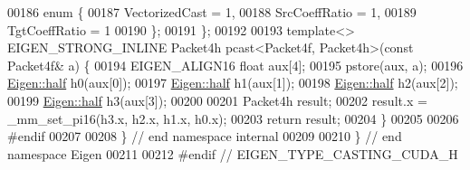 \begin{DoxyCode}
00186   \textcolor{keyword}{enum} \{
00187     VectorizedCast = 1,
00188     SrcCoeffRatio = 1,
00189     TgtCoeffRatio = 1
00190   \};
00191 \};
00192 
00193 \textcolor{keyword}{template}<> EIGEN\_STRONG\_INLINE Packet4h pcast<Packet4f, Packet4h>(\textcolor{keyword}{const} Packet4f& a) \{
00194   EIGEN\_ALIGN16 \textcolor{keywordtype}{float} aux[4];
00195   pstore(aux, a);
00196   \hyperlink{struct_eigen_1_1half}{Eigen::half} h0(aux[0]);
00197   \hyperlink{struct_eigen_1_1half}{Eigen::half} h1(aux[1]);
00198   \hyperlink{struct_eigen_1_1half}{Eigen::half} h2(aux[2]);
00199   \hyperlink{struct_eigen_1_1half}{Eigen::half} h3(aux[3]);
00200 
00201   Packet4h result;
00202   result.x = \_mm\_set\_pi16(h3.x, h2.x, h1.x, h0.x);
00203   \textcolor{keywordflow}{return} result;
00204 \}
00205 
00206 \textcolor{preprocessor}{#endif}
00207 
00208 \} \textcolor{comment}{// end namespace internal}
00209 
00210 \} \textcolor{comment}{// end namespace Eigen}
00211 
00212 \textcolor{preprocessor}{#endif // EIGEN\_TYPE\_CASTING\_CUDA\_H}
\end{DoxyCode}
